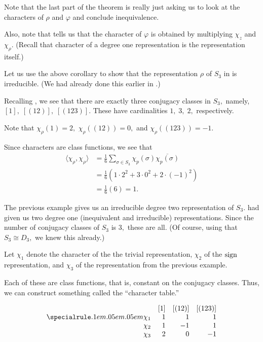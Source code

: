 \begin{rem}
	Note that the last part of the theorem is really just asking us to look at the characters of $\rho$ and $\varphi$ and conclude inequivalence.

	Also, note that  tells us that the character of $\varphi$ is obtained by multiplying $\chi_z$ and $\chi_\rho.$ (Recall that character of a degree one representation is the representation itself.)
\end{rem}

\begin{ex}
	Let us use the above corollary to show that the representation $\rho$ of $S_3$ in  is irreducible. (We had already done this earlier in .)

	Recalling , we see that there are exactly three conjugacy classes in $S_3,$ namely, $[1],\;[(12)],\;[(123)].$ These have cardinalities $1,\;3,\;2,$ respectively. 

	Note that $\chi_\rho(1) = 2,$ $\chi_\rho\left((12)\right) = 0,$ and $\chi_\rho\left((123)\right) = -1.$

	Since characters are class functions, we see that
	\begin{align*} 
		\langle \chi_\rho, \chi_\rho\rangle &= \frac{1}{6}\sum_{\sigma \in S_3} \chi_p(\sigma)\overline{\chi_p(\sigma)}\\
		&= \frac{1}{6}(1\cdot2^2 + 3\cdot0^2 + 2\cdot(-1)^2)\\
		&= \frac{1}{6}(6) = 1.
	\end{align*}
\end{ex}
\begin{ex}
	The previous example gives us an irreducible degree two representation of $S_3.$  had given us two degree one (inequivalent and irreducible) representations. Since the number of conjugacy classes of $S_3$ is $3,$ these are all. (Of course, using that $S_3 \cong D_3,$ we knew this already.)

	Let $\chi_1$ denote the character of the the trivial representation, $\chi_2$ of the $\operatorname{sign}$ representation, and $\chi_3$ of the representation from the previous example.

	Each of these are class functions, that is, constant on the conjugacy classes. Thus, we can construct something called the ``character table.''

	\captionsetup{type=figure}
	\[\begin{array}{rrrr}
		 & [1] & [(12)] & [(123)]\\
		\thiccline
		\chi_1 & 1 & 1 & 1\\
		\chi_2 & 1 & -1 & 1\\
		\chi_3 & 2 & 0 & -1	
	\end{array}\]
	 \label{tab:charS3}
	
\end{ex}

